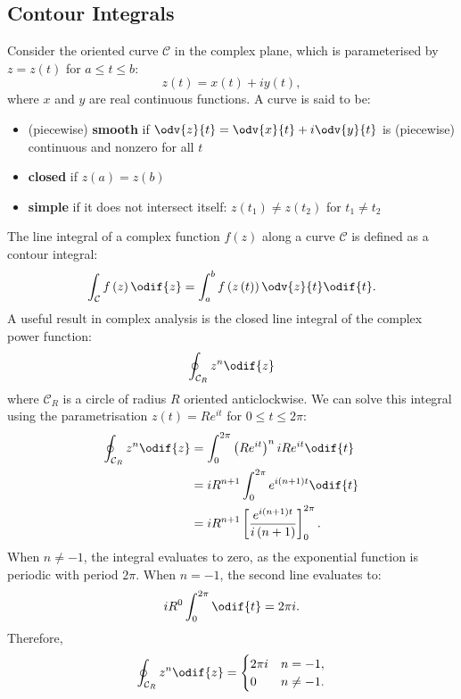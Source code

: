 \documentclass{article}
\begin{document}
\subsection{Contour Integrals}
Consider the oriented curve \(\mathcal{C}\) in the complex plane, which
is parameterised by \(z = z\left( t \right)\) for \(a \leqslant t
\leqslant b\):
\begin{equation*}
    z\left( t \right) = x\left( t \right) + i y\left( t \right),
\end{equation*}
where \(x\) and \(y\) are real continuous functions. A curve is said to
be:
\begin{itemize}
    \item (piecewise) \textbf{smooth} if \(\odv{z}{t} = \odv{x}{t} + i \odv{y}{t}\) is (piecewise) continuous and nonzero for all \(t\)
    \item \textbf{closed} if \(z\left( a \right) = z\left( b \right)\)
    \item \textbf{simple} if it does not intersect itself: \(z\left( t_1 \right) \neq z\left( t_2 \right)\) for \(t_1 \neq t_2\)
\end{itemize}
The line integral of a complex function \(f\left( z \right)\) along a
curve \(\mathcal{C}\) is defined as a contour integral:
\begin{equation*}
    \int_{\mathcal{C}} f\left( z \right) \odif{z} = \int_a^b f\left( z\left( t \right) \right) \odv{z}{t} \odif{t}.
\end{equation*}
A useful result in complex analysis is the closed line integral of the
complex power function:
\begin{equation*}
    \oint_{\mathcal{C}_R} z^n \odif{z}
\end{equation*}
where \(\mathcal{C}_R\) is a circle of radius \(R\) oriented anticlockwise.
We can solve this integral using the parametrisation \(z\left( t \right) = R e^{i t}\)
for \(0 \leqslant t \leqslant 2 \pi\):
\begin{align*}
    \oint_{\mathcal{C}_R} z^n \odif{z} & = \int_0^{2 \pi} \left( R e^{i t} \right)^n i R e^{i t} \odif{t}                                    \\
                                       & = i R^{n + 1} \int_0^{2 \pi} e^{i \left( n + 1 \right) t} \odif{t}                                  \\
                                       & = i R^{n + 1} \left[ \frac{e^{i \left( n + 1 \right) t}}{i \left( n + 1 \right)} \right]_0^{2 \pi}.
\end{align*}
When \(n \neq -1\), the integral evaluates to zero, as the exponential
function is periodic with period \(2 \pi\). When \(n = -1\), the second
line evaluates to:
\begin{equation*}
    i R^0 \int_0^{2 \pi} \odif{t} = 2 \pi i.
\end{equation*}
Therefore,
\begin{equation*}
    \oint_{\mathcal{C}_R} z^n \odif{z} =
    \begin{cases}
        2 \pi i & n = -1,    \\
        0       & n \neq -1.
    \end{cases}
\end{equation*}
\end{document}
